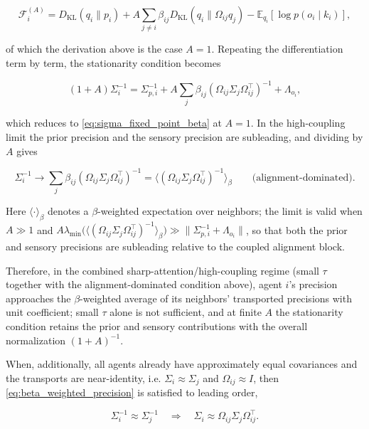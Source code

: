 \documentclass[11pt]{article}
\begin{document}
\begin{equation}
\mathcal{F}_i^{(A)}
=D_{\mathrm{KL}}(q_i \| p_i)
+ A \sum_{j \neq i} \beta_{ij}
D_{\mathrm{KL}}(q_i \| \Omega_{ij} q_j)
- \mathbb{E}_{q_i}[\log p(o_i \mid k_i)],
\end{equation}

of which the derivation above is the case $A = 1$. Repeating the differentiation term by term, the stationarity condition becomes

\begin{equation}
(1 + A)\Sigma_i^{-1}
=\Sigma_{p,i}^{-1}
+ A \sum_j \beta_{ij}
(\Omega_{ij}\Sigma_j\Omega_{ij}^\top)^{-1}
+ \Lambda_{o_i},
\end{equation}

which reduces to \eqref{eq:sigma_fixed_point_beta} at $A = 1$. In the high-coupling limit the prior precision and the sensory precision are subleading, and dividing by $A$ gives

\begin{equation}
\boxed{
\Sigma_i^{-1}
\longrightarrow
\sum_j \beta_{ij}
(\Omega_{ij}\Sigma_j\Omega_{ij}^\top)^{-1}
=\big\langle(\Omega_{ij}\Sigma_j\Omega_{ij}^\top)^{-1}
\big\rangle_{\beta}
\qquad \text{(alignment-dominated)}.}
\label{eq:beta_weighted_precision}
\end{equation}

Here $\langle \cdot \rangle_{\beta}$ denotes a $\beta$-weighted expectation over neighbors; the limit is valid when $A \gg 1$ and $A\lambda_{\min}\big(\langle(\Omega_{ij}\Sigma_j\Omega_{ij}^\top)^{-1}\rangle_\beta\big) \gg \|\Sigma_{p,i}^{-1} + \Lambda_{o_i}\|$, so that both the prior and sensory precisions are subleading relative to the coupled alignment block.

Therefore, in the combined sharp-attention/high-coupling regime (small $\tau$ together with the alignment-dominated condition above), agent $i$'s precision approaches the $\beta$-weighted average of its neighbors' transported precisions with unit coefficient; small $\tau$ alone is not sufficient, and at finite $A$ the stationarity condition retains the prior and sensory contributions with the overall normalization $(1+A)^{-1}$.

When, additionally, all agents already have approximately equal covariances and the transports are near-identity, i.e. $\Sigma_i \approx \Sigma_j$ and $\Omega_{ij} \approx I$, then \eqref{eq:beta_weighted_precision} is satisfied to leading order,

\begin{equation}
\Sigma_i^{-1} \approx \Sigma_j^{-1}
\quad\Longrightarrow\quad
\Sigma_i \approx \Omega_{ij}\Sigma_j\Omega_{ij}^\top.
\end{equation}
\end{document}
